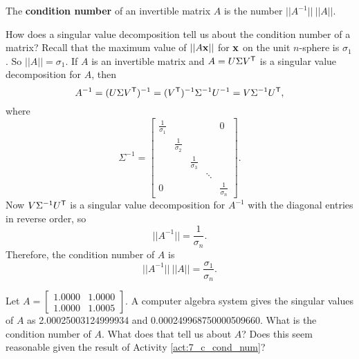 \begin{definition} The \textbf{condition number} of an invertible matrix $A$ is the number $||A^{-1}|| \ ||A||$.
\end{definition}

How does a singular value decomposition tell us about the condition number of a matrix? Recall that the maximum value of $||A\mathbf{x}||$ for $\mathbf{x}$ on the unit $n$-sphere is $\sigma_1$. So $||A|| = \sigma_1$. If $A$ is an invertible matrix and $A = U \Sigma V^{\mathsf{T}}$ is a singular value decomposition for $A$, then
\[A^{-1} = (U \Sigma V^{\mathsf{T}})^{-1} = (V^{\mathsf{T}})^{-1} \Sigma^{-1} U^{-1} = V \Sigma^{-1} U^{\mathsf{T}},\]
where
\[\Sigma^{-1} = \left[ \begin{array}{ccccc} \frac{1}{\sigma_1}&&&&0 \\ & \frac{1}{\sigma_2}&&& \\ && \frac{1}{\sigma_3}&& \\ &  & & \ddots &  \\ 0&&&& \frac{1}{\sigma_n} \end{array} \right].\]
Now $V \Sigma^{-1} U^{\mathsf{T}}$ is a singular value decomposition for $A^{-1}$ with the diagonal entries in reverse order, so
\[||A^{-1}|| = \frac{1}{\sigma_n}.\]
Therefore, the condition number of $A$ is
\[||A^{-1}|| \ ||A|| = \frac{\sigma_1}{\sigma_n}.\]



\begin{activity} Let $A = \left[ \begin{array}{cc} 1.0000&1.0000 \\ 1.0000&1.0005 \end{array} \right]$. A computer algebra system gives the singular values of $A$ as 2.00025003124999934 and 0.000249968750000509660. What is the condition number of $A$. What does that tell us about $A$? Does this seem reasonable given the result of Activity \ref{act:7_c_cond_num}?



\end{activity}



